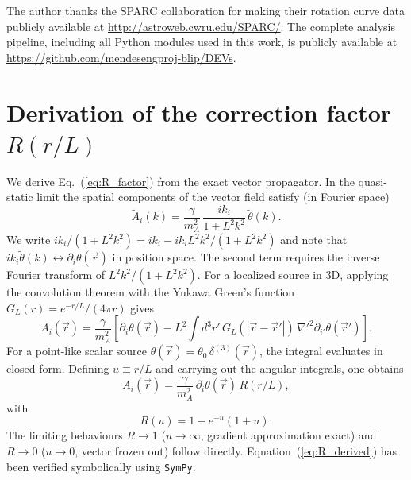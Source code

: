 \documentclass[aps,prd,reprint,floatfix,nofootinbib,superscriptaddress]{revtex4-2}
\begin{document}
\begin{acknowledgments}
The author thanks the SPARC collaboration for making their
rotation curve data publicly available at
\url{http://astroweb.cwru.edu/SPARC/}. The complete analysis
pipeline, including all Python modules used in this work, is
publicly available at
\url{https://github.com/mendesengproj-blip/DEVs}.
\end{acknowledgments}

\appendix

\section{Derivation of the correction factor $R(r/L)$}
\label{app:R_derivation}

We derive Eq.~(\ref{eq:R_factor}) from the exact vector propagator.
In the quasi-static limit the spatial components of the vector field
satisfy (in Fourier space)
\begin{equation}
  \tilde A_i(k) = \frac{\gamma}{m_A^2}\,
                  \frac{ik_i}{1+L^2k^2}\,\tilde\theta(k).
\end{equation}
We write $ik_i/(1+L^2k^2) = ik_i - ik_i L^2k^2/(1+L^2k^2)$ and
note that $ik_i\tilde\theta(k) \leftrightarrow \partial_i\theta(\vec r)$
in position space. The second term requires the inverse Fourier
transform of $L^2 k^2 / (1+L^2 k^2)$. For a localized source in
3D, applying the convolution theorem with the Yukawa Green's function
$G_L(r) = e^{-r/L}/(4\pi r)$ gives
\begin{equation}
  A_i(\vec r) = \frac{\gamma}{m_A^2}\left[
    \partial_i\theta(\vec r)
    - L^2 \int d^3r'\,G_L(|\vec r - \vec r'|)\,
      \nabla'^2\partial_{i'}\theta(\vec r')
  \right].
\end{equation}
For a point-like scalar source $\theta(\vec r) = \theta_0\,\delta^{(3)}(\vec r)$,
the integral evaluates in closed form. Defining
$u \equiv r/L$ and carrying out the angular integrals, one obtains
\begin{equation}
  A_i(\vec r) = \frac{\gamma}{m_A^2}\,\partial_i\theta(\vec r)\,
                R(r/L),
\end{equation}
with
\begin{equation}
  R(u) = 1 - e^{-u}(1 + u).
  \label{eq:R_derived}
\end{equation}
The limiting behaviours $R\to 1$ ($u\to\infty$, gradient approximation
exact) and $R\to 0$ ($u\to 0$, vector frozen out) follow directly.
Equation~(\ref{eq:R_derived}) has been verified symbolically using
\texttt{SymPy}.
\end{document}
